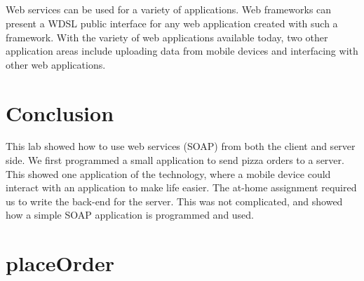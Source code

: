 \documentclass[11pt]{article}
\begin{document}
\subsection{}

Web services can be used for a variety of applications. Web frameworks can present a WDSL public interface for any web application created with such a framework. With the variety of web applications available today, two other application areas include uploading data from mobile devices and interfacing with other web applications.

\newpage
\section{Conclusion}

This lab showed how to use web services (SOAP) from both the client and server side. We first programmed a small application to send pizza orders to a server. This showed one application of the technology, where a mobile device could interact with an application to make life easier. The at-home assignment required us to write the back-end for the server. This was not complicated, and showed how a simple SOAP application is programmed and used.

\appendix

\newpage
\section{placeOrder}
\label{place-order-code}


\end{document}
